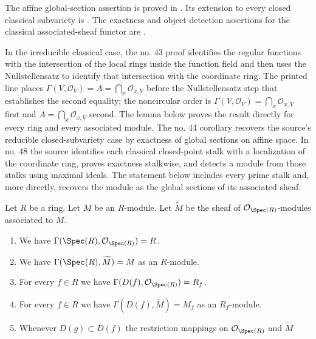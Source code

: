 \begin{lemma}
\label{lemma-spec-sheaves}
\begin{reference}
\cite[Chapter II, \S 1, no. 31, p. 224]{FAC}
The affine global-section assertion is proved in
\cite[Chapter II, \S 3, no. 43, Proposition 4, p. 235]{FAC}.
Its extension to every closed classical subvariety is
\cite[Chapter II, \S 3, no. 44, Proposition 7, Corollary 3,
p. 237]{FAC}.
The exactness and object-detection assertions for the classical
associated-sheaf functor are
\cite[Chapter II, \S 4, no. 48, Propositions 1 and 2,
pp. 240--241]{FAC}.
\end{reference}
\begin{history}
In the irreducible classical case, the no. 43 proof identifies the
regular functions with the intersection of the local rings inside the
function field and then uses the Nullstellensatz to identify that intersection
with the coordinate ring. The printed line places
$\Gamma(V, \mathcal{O}_V)=A=\bigcap_x\mathcal{O}_{x,V}$ before the
Nullstellensatz step that establishes the second equality; the noncircular
order is $\Gamma(V, \mathcal{O}_V)=\bigcap_x\mathcal{O}_{x,V}$ first and
$A=\bigcap_x\mathcal{O}_{x,V}$ second. The lemma below proves the result
directly for every ring and every associated module. The no. 44 corollary
recovers the source's reducible closed-subvariety case by exactness of global
sections on affine space. In no. 48 the source identifies each classical
closed-point stalk with a localization of the coordinate ring, proves
exactness stalkwise, and detects a module from those stalks using maximal
ideals. The statement below includes every prime stalk and, more directly,
recovers the module as the global sections of its associated sheaf.
\end{history}
Let $R$ be a ring. Let $M$ be an $R$-module. Let $\widetilde M$
be the sheaf of $\mathcal{O}_{\Spec(R)}$-modules
associated to $M$.
\begin{enumerate}
\item We have $\Gamma(\Spec(R), \mathcal{O}_{\Spec(R)}) = R$.
\item We have $\Gamma(\Spec(R), \widetilde M) = M$ as an $R$-module.
\item For every $f \in R$ we have
$\Gamma(D(f), \mathcal{O}_{\Spec(R)}) = R_f$.
\item For every $f\in R$ we have $\Gamma(D(f), \widetilde M) = M_f$
as an $R_f$-module.
\item Whenever $D(g) \subset D(f)$ the restriction mappings
on $\mathcal{O}_{\Spec(R)}$ and $\widetilde M$

\end{enumerate}
\end{lemma}

